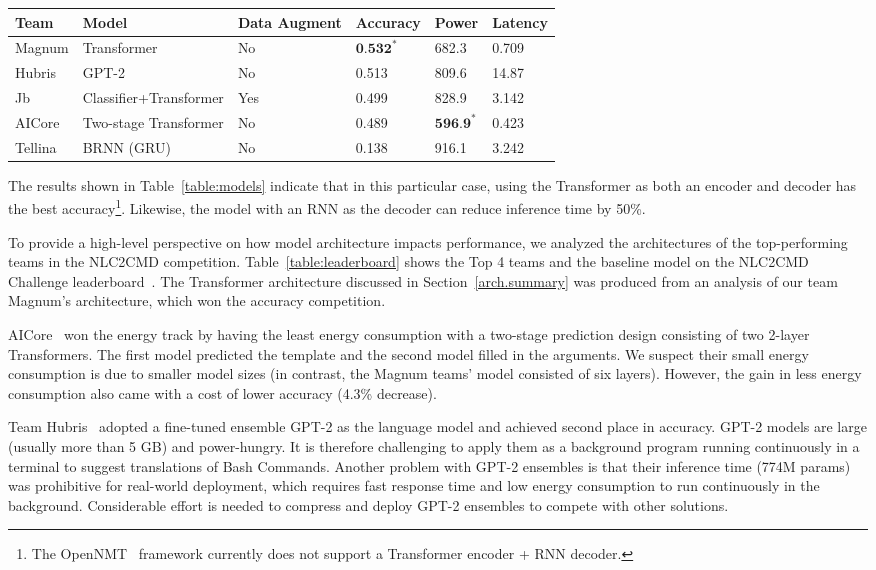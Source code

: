 \documentclass{river-journal}
\begin{document}
\begin{table*}[bhtp]
\caption{\label{table:leaderboard} The NLC2CMD Leaderboard}
\centering
\begin{tabular}{llllll}
\hline \textbf{Team} & \textbf{Model} & \textbf{Data Augment}& \textbf{Accuracy} & \textbf{Power} & \textbf{Latency}
\\\hline
Magnum & Transformer & No & $\mathbf{0 . 5 3 2}^{*}$ & 682.3 & 0.709 \\
Hubris & GPT-2 & No & 0.513 & 809.6 & 14.87 \\
Jb & Classifier+Transformer & Yes & 0.499 & 828.9 & 3.142 \\
AICore & Two-stage Transformer & No & 0.489 & $\mathbf{5 9 6 . 9}^{*}$ & 0.423 \\
Tellina~\cite{Lin2017ProgramSF} & BRNN (GRU) & No & 0.138 & 916.1 & 3.242 \\
\hline
\end{tabular}
\end{table*}

The results shown in Table~\ref{table:models} indicate that in this particular case, using the Transformer as both an encoder and decoder has the best accuracy\footnote{The OpenNMT~\cite{Klein2017OpenNMTOT} framework currently does not support a Transformer encoder + RNN decoder.}. Likewise, the model with an RNN as the decoder can reduce inference time by 50\%.

To provide a high-level perspective on how model architecture impacts performance, we analyzed the architectures of the top-performing teams in the NLC2CMD competition. Table~\ref{table:leaderboard} shows the Top 4 teams and the baseline model on the NLC2CMD Challenge leaderboard~\cite{Agarwal2021NeurIPS2N}. The Transformer architecture discussed in Section~\ref{arch.summary} was produced from an analysis of our team Magnum's architecture, which won the accuracy competition. 

AICore~\cite{Agarwal2021NeurIPS2N} won the energy track by having the least energy consumption with a two-stage prediction design consisting of two 2-layer Transformers. The first model predicted the template and the second model filled in the arguments. We suspect their small energy consumption is due to smaller model sizes (in contrast, the Magnum teams' model consisted of six layers). However, the gain in less energy consumption also came with a cost of lower accuracy (4.3\% decrease). 

Team Hubris~\cite{Agarwal2021NeurIPS2N} adopted a fine-tuned ensemble GPT-2 as the language model and achieved second place in accuracy. GPT-2 models are large (usually more than 5 GB) and power-hungry. It is therefore challenging to apply them as a background program running continuously in a terminal to suggest translations of Bash Commands. Another problem with GPT-2 ensembles is that their inference time (774M params) was prohibitive for real-world deployment, which requires fast response time and low energy consumption to run continuously in the background. Considerable effort is needed to compress and deploy GPT-2 ensembles to compete with other solutions.
\end{document}
